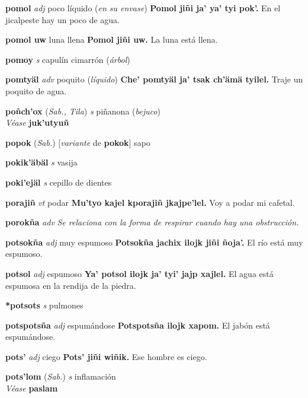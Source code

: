 \documentclass[10pt]{scrbook}
\newcommand{\entry}[1]{\textbf{#1}}
\newcommand{\nontranslationdef}[1]{\textit{#1}}
\newcommand{\partofspeech}[1]{\textit{#1}}
\newcommand{\spanishtranslation}[1]{#1}
\newcommand{\clarification}[1]{(\textit{#1})}
\newcommand{\cholexample}[1]{\textbf{#1}}
\newcommand{\exampletranslation}[1]{#1}
\newcommand{\alsosee}[1]{\\\textit{Véase} \textbf{#1}}
\newcommand{\relevantdialect}[1]{(\textit{#1})}
\newcommand{\conjugationtense}[1]{[\textit{#1}}
\newcommand{\conjugationverb}[1]{de \textbf{#1}]}
\begin{document}
\begin{multicols}{2}
\entry{pomol}
\partofspeech{adj}
\spanishtranslation{poco líquido}
\clarification{en su envase}
\cholexample{Pomol jiñi ja' ya' tyi pok'.}
\exampletranslation{En el jicalpeste hay un poco de agua.}

\entry{pomol uw}
\spanishtranslation{luna llena}
\cholexample{Pomol jiñi uw.}
\exampletranslation{La luna está llena.}

\entry{pomoy}
\partofspeech{s}
\spanishtranslation{capulín cimarrón}
\clarification{árbol}

\entry{pomtyäl}
\partofspeech{adv}
\spanishtranslation{poquito}
\clarification{líquido}
\cholexample{Che' pomtyäl ja' tsak ch'ämä tyilel.}
\exampletranslation{Traje un poquito de agua.}

\entry{poñch'ox}
\relevantdialect{Sab., Tila}
\partofspeech{s}
\spanishtranslation{piñanona}
\clarification{bejuco}
\alsosee{juk'utyuñ}

\entry{popok}
\relevantdialect{Sab.}
\conjugationtense{variante}
\conjugationverb{pokok}
\spanishtranslation{sapo}

\entry{pokik'äbäl}
\partofspeech{s}
\spanishtranslation{vasija}

\entry{poki'ejäl}
\partofspeech{s}
\spanishtranslation{cepillo de dientes}

\entry{porajiñ}
\partofspeech{vt}
\spanishtranslation{podar}
\cholexample{Mu'tyo kajel kporajiñ jkajpe'lel.}
\exampletranslation{Voy a podar mi cafetal.}

\entry{porokña}
\partofspeech{adv}
\nontranslationdef{Se relaciona con la forma de respirar cuando hay una obstrucción.}

\entry{potsokña}
\partofspeech{adj}
\spanishtranslation{muy espumoso}
\cholexample{Potsokña jachix ilojk jiñi ñoja'.}
\exampletranslation{El río está muy espumoso.}

\entry{potsol}
\partofspeech{adj}
\spanishtranslation{espumoso}
\cholexample{Ya' potsol ilojk ja' tyi' jajp xajlel.}
\exampletranslation{El agua está espumosa en la rendija de la piedra.}

\entry{*potsots}
\partofspeech{s}
\spanishtranslation{pulmones}

\entry{potspotsña}
\partofspeech{adj}
\spanishtranslation{espumándose}
\cholexample{Potspotsña ilojk xapom.}
\exampletranslation{El jabón está espumándose.}

\entry{pots'}
\partofspeech{adj}
\spanishtranslation{ciego}
\cholexample{Pots' jiñi wiñik.}
\exampletranslation{Ese hombre es ciego.}

\entry{pots'lom}
\relevantdialect{Sab.}
\partofspeech{s}
\spanishtranslation{inflamación}
\alsosee{paslam}


\end{multicols}
\end{document}
